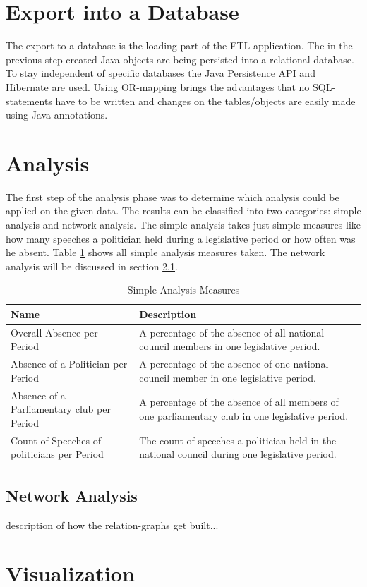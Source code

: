 \section{Export into a Database}
\label{sec:export_db}
The export to a database is the loading part of the ETL-application. The in the previous step created Java objects are being persisted into a relational database. To stay independent of specific databases the Java Persistence API and Hibernate are used. Using OR-mapping brings the advantages that no SQL-statements have to be written and changes on the tables/objects are easily made using Java annotations.

\section{Analysis}
\label{sec:analysis}
The first step of the analysis phase was to determine which analysis could be applied on the given data. The results can be classified into two categories: simple analysis and network analysis. The simple analysis takes just simple measures like how many speeches a politician held during a legislative period or how often was he absent. Table \ref{table:simple_analysis} shows all simple analysis measures taken. The network analysis will be discussed in section \ref{sec:network_analysis}.

\begin{table}
\begin{tabular}{| p{5cm} | p{8cm} |}
\hline
  Name & Description \\
\hline
\hline
  Overall Absence per Period & A percentage of the absence of all national council members in one legislative period. \\
\hline
Absence of a Politician per Period & A percentage of the absence of one national council member in one legislative period. \\
\hline
Absence of a Parliamentary club per Period & A percentage of the absence of all members of one parliamentary club in one legislative period. \\
\hline
Count of Speeches of politicians per Period & The count of speeches a politician held in the national council during one legislative period. \\
\hline

\end{tabular}

\caption{Simple Analysis Measures}
\label{table:simple_analysis}
\end{table}

\subsection{Network Analysis}
\label{sec:network_analysis}
description of how the relation-graphs get built...

\section{Visualization}
\label{sec:visualization}
